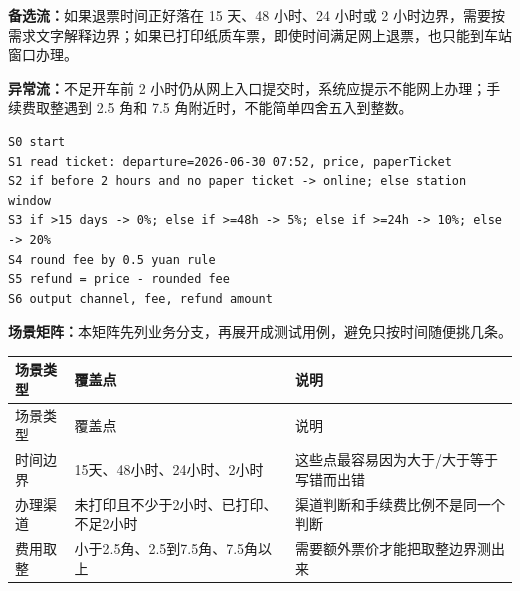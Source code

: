 \documentclass[bwprint]{report}
\begin{document}
\textbf{备选流：}如果退票时间正好落在 15 天、48 小时、24 小时或 2 小时边界，需要按需求文字解释边界；如果已打印纸质车票，即使时间满足网上退票，也只能到车站窗口办理。

\textbf{异常流：}不足开车前 2 小时仍从网上入口提交时，系统应提示不能网上办理；手续费取整遇到 2.5 角和 7.5 角附近时，不能简单四舍五入到整数。

\begin{lstlisting}
S0 start
S1 read ticket: departure=2026-06-30 07:52, price, paperTicket
S2 if before 2 hours and no paper ticket -> online; else station window
S3 if >15 days -> 0%; else if >=48h -> 5%; else if >=24h -> 10%; else -> 20%
S4 round fee by 0.5 yuan rule
S5 refund = price - rounded fee
S6 output channel, fee, refund amount
\end{lstlisting}

\textbf{场景矩阵：}本矩阵先列业务分支，再展开成测试用例，避免只按时间随便挑几条。
{
\setlength{\tabcolsep}{3pt}
\begin{longtable}{P{2.3cm}P{4.6cm}P{4.7cm}}
\toprule
场景类型 & 覆盖点 & 说明\\
\midrule
\endfirsthead
\toprule
场景类型 & 覆盖点 & 说明\\
\midrule
\endhead
时间边界 & 15天、48小时、24小时、2小时 & 这些点最容易因为大于/大于等于写错而出错 \\
办理渠道 & 未打印且不少于2小时、已打印、不足2小时 & 渠道判断和手续费比例不是同一个判断 \\
费用取整 & 小于2.5角、2.5到7.5角、7.5角以上 & 需要额外票价才能把取整边界测出来 \\
\bottomrule
\end{longtable}
}
\end{document}
